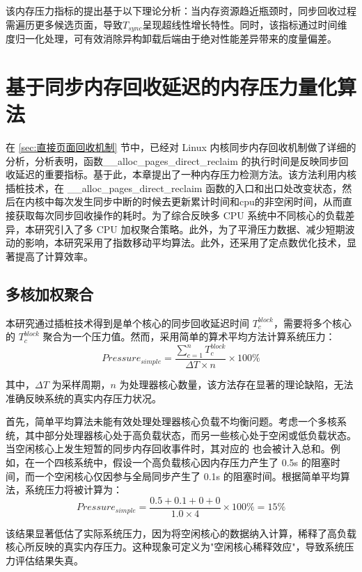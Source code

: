 该内存压力指标的提出基于以下理论分析：当内存资源趋近瓶颈时，同步回收过程需遍历更多候选页面，导致\(T_{sync}\)呈现超线性增长特性。同时，该指标通过时间维度归一化处理，可有效消除异构卸载后端由于绝对性能差异带来的度量偏差。

\section{基于同步内存回收延迟的内存压力量化算法}
\label{sec:基于同步内存回收延迟的内存压力量化算法}

在 \ref{sec:直接页面回收机制} 节中，已经对 Linux 内核同步内存回收机制做了详细的分析，分析表明，函数\_\_alloc\_pages\_direct\_reclaim 的执行时间是反映同步回收延迟的重要指标。基于此，本章提出了一种内存压力检测方法。该方法利用内核插桩技术，在 \_\_alloc\_pages\_direct\_reclaim 函数的入口和出口处改变状态，然后在内核中每次发生同步中断的时候去更新累计时间和cpu的非空闲时间，从而直接获取每次同步回收操作的耗时。为了综合反映多 CPU 系统中不同核心的负载差异，本研究引入了多 CPU 加权聚合策略。此外，为了平滑压力数据、减少短期波动的影响，本研究采用了指数移动平均算法。此外，还采用了定点数优化技术，显著提高了计算效率。

\subsection{多核加权聚合}

本研究通过插桩技术得到是单个核心的同步回收延迟时间 \(T_c^{block}\)，需要将多个核心的 \(T_c^{block}\) 聚合为一个压力值。然而，采用简单的算术平均方法计算系统压力：
\begin{equation}
    Pressure_{simple} = \frac{\sum_{c=1}^{n} T_c^{block}}{\Delta T \times n} \times 100\%
\end{equation}

其中，\(\Delta T\) 为采样周期，\(n\) 为处理器核心数量，该方法存在显著的理论缺陷，无法准确反映系统的真实内存压力状况。

首先，简单平均算法未能有效处理处理器核心负载不均衡问题。考虑一个多核系统，其中部分处理器核心处于高负载状态，而另一些核心处于空闲或低负载状态。当空闲核心上发生短暂的同步内存回收事件时，其对应的  也会被计入总和。例如，在一个四核系统中，假设一个高负载核心因内存压力产生了 0.5s 的阻塞时间，而一个空闲核心仅因参与全局同步产生了 0.1s 的阻塞时间。根据简单平均算法，系统压力将被计算为：
\[
Pressure_{simple} = \frac{0.5 + 0.1 + 0 + 0}{1.0 \times 4} \times 100\% = 15\%
\]

该结果显著低估了实际系统压力，因为将空闲核心的数据纳入计算，稀释了高负载核心所反映的真实内存压力。这种现象可定义为"空闲核心稀释效应"，导致系统压力评估结果失真。

